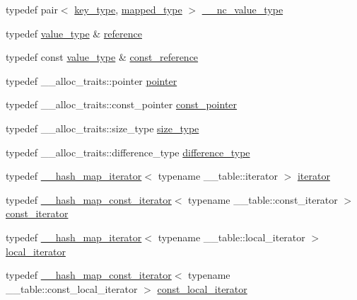 \begin{DoxyCompactItemize}
\item 
typedef pair$<$ \hyperlink{class__map_a38e77c21e3aba60e817666c55ff61164}{key\+\_\+type}, \hyperlink{class__map_a652392c4150010664c8b1b76e460ae0a}{mapped\+\_\+type} $>$ \hyperlink{class__map_acee1b994658827e62a6bdebca910a233}{\+\_\+\+\_\+nc\+\_\+value\+\_\+type}
\item 
typedef \hyperlink{class__map_a840dcfbf8726d7ecdd0298ffc6afde52}{value\+\_\+type} \& \hyperlink{class__map_a1c5ff1b6621aa3b9adc9bb651ffd4969}{reference}
\item 
typedef const \hyperlink{class__map_a840dcfbf8726d7ecdd0298ffc6afde52}{value\+\_\+type} \& \hyperlink{class__map_afeab752350dfbac51c9a35d67270c99f}{const\+\_\+reference}
\item 
typedef \+\_\+\+\_\+alloc\+\_\+traits\+::pointer \hyperlink{class__map_aaa37e465530f795edf03ac133f0a9a60}{pointer}
\item 
typedef \+\_\+\+\_\+alloc\+\_\+traits\+::const\+\_\+pointer \hyperlink{class__map_a12b2f2762c9383a99c0caf9b2f3ec696}{const\+\_\+pointer}
\item 
typedef \+\_\+\+\_\+alloc\+\_\+traits\+::size\+\_\+type \hyperlink{class__map_adc37f621be25fda072b12873e60e9fc7}{size\+\_\+type}
\item 
typedef \+\_\+\+\_\+alloc\+\_\+traits\+::difference\+\_\+type \hyperlink{class__map_aacdde0553a8fa29ac5cb1678bdf04098}{difference\+\_\+type}
\item 
typedef \hyperlink{class____hash__map__iterator}{\+\_\+\+\_\+hash\+\_\+map\+\_\+iterator}$<$ typename \+\_\+\+\_\+table\+::iterator $>$ \hyperlink{class__map_a9ed817d33532f34fc46649b3fbe8e612}{iterator}
\item 
typedef \hyperlink{class____hash__map__const__iterator}{\+\_\+\+\_\+hash\+\_\+map\+\_\+const\+\_\+iterator}$<$ typename \+\_\+\+\_\+table\+::const\+\_\+iterator $>$ \hyperlink{class__map_ab0513968c2610ccf3b3fe070184396aa}{const\+\_\+iterator}
\item 
typedef \hyperlink{class____hash__map__iterator}{\+\_\+\+\_\+hash\+\_\+map\+\_\+iterator}$<$ typename \+\_\+\+\_\+table\+::local\+\_\+iterator $>$ \hyperlink{class__map_a715fe122a46eecc92c19958b56ed91e4}{local\+\_\+iterator}
\item 
typedef \hyperlink{class____hash__map__const__iterator}{\+\_\+\+\_\+hash\+\_\+map\+\_\+const\+\_\+iterator}$<$ typename \+\_\+\+\_\+table\+::const\+\_\+local\+\_\+iterator $>$ \hyperlink{class__map_aa447944b5b72b05cb3d909f7ac48d2d7}{const\+\_\+local\+\_\+iterator}
\end{DoxyCompactItemize}
